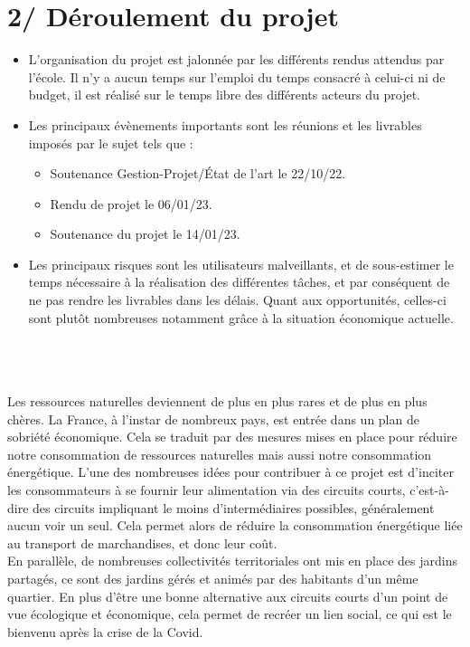 \documentclass{report}
\begin{document}
\section*{2/ Déroulement du projet}
\begin{itemize}
    \item L'organisation du projet est jalonnée par les différents rendus attendus par l'école. Il n'y a aucun temps sur l'emploi du temps consacré à celui-ci ni de budget, il est réalisé sur le temps libre des différents acteurs du projet.
    \item Les principaux évènements importants sont les réunions et les livrables imposés par le sujet tels que :
        \begin{itemize}
        \item Soutenance Gestion-Projet/État de l'art le 22/10/22.
        \item Rendu de projet le 06/01/23.
        \item Soutenance du projet le 14/01/23.
    \end{itemize}
    \item Les principaux risques sont les utilisateurs malveillants, et de sous-estimer le temps nécessaire à la réalisation des différentes tâches, et par conséquent de ne pas rendre les livrables dans les délais. Quant aux opportunités, celles-ci sont plutôt nombreuses notamment grâce à la situation économique actuelle.
\end{itemize}

\newpage








\begin{center}
    \textbf{\color{orange}{\Huge Cadrage}} \\
\end{center}   
    \section*{\color{orange}{\Large Contexte}} 
    Les ressources naturelles deviennent de plus en plus rares et de plus en plus chères. La France, à l’instar de nombreux pays, est entrée dans un plan de sobriété économique. Cela se traduit par des mesures mises en place pour réduire notre consommation de ressources naturelles mais aussi notre consommation énergétique. 
    L’une des nombreuses idées pour contribuer à ce projet est d’inciter les consommateurs à se fournir leur alimentation via des circuits courts, c'est-à-dire des circuits impliquant le moins d’intermédiaires possibles, généralement aucun voir un seul. Cela permet alors de réduire la consommation énergétique liée au transport de marchandises, et donc leur coût. \\
    En parallèle, de nombreuses collectivités territoriales ont mis en place des jardins partagés, ce sont des jardins gérés et animés par des habitants d’un même quartier. En plus d’être une bonne alternative aux circuits courts d’un point de vue écologique et économique, cela permet de recréer un lien social, ce qui est le bienvenu après la crise de la Covid. \\
    
\end{document}
